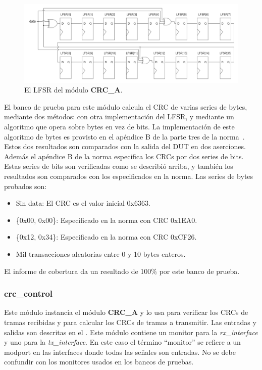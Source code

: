 \documentclass[a4paper, twoside, 11pt]{report}
\begin{document}
\begin{figure}[htb]
  \centering
  \includegraphics[width=1.0\textwidth]{./img/crc_a_lfsr}
  \caption{El LFSR del módulo \textbf{CRC\_A}.}
  \label{fig:crc_lfsr}
\end{figure}

El banco de prueba para este módulo calcula el CRC de varias series de bytes, mediante dos métodos: con otra implementación del LFSR, y mediante un algoritmo que opera sobre bytes en vez de bits. La implementación de este algoritmo de bytes es provisto en el apéndice B de la parte tres de la norma~\cite{iso14443-3}. Estos dos resultados son comparados con la salida del DUT en dos aserciones. Además el apéndice B de la norma especifica los CRCs por dos series de bits. Estas series de bits son verificadas como se describió arriba, y también los resultados son comparados con los especificados en la norma. Las series de bytes probados son:

\begin{itemize}
  \item Sin data: El CRC es el valor inicial 0x6363.
  \item \{0x00, 0x00\}: Especificado en la norma con CRC 0x1EA0.
  \item \{0x12, 0x34\}: Especificado en la norma con CRC 0xCF26.
  \item Mil transacciones aleatorias entre 0 y 10 bytes enteros.
\end{itemize}

El informe de cobertura da un resultado de 100\% por este banco de prueba.

\FloatBarrier
\subsubsection{crc\_control}

Este módulo instancia el módulo \textbf{CRC\_A} y lo usa para verificar los CRCs de tramas recibidas y para calcular los CRCs de tramas a transmitir. Las entradas y salidas son descritas en el . Este módulo contiene un monitor para la \textit{rx\_interface} y uno para la \textit{tx\_interface}. En este caso el término “monitor” se refiere a un modport en las interfaces donde todas las señales son entradas. No se debe confundir con los monitores usados en los bancos de pruebas.
\end{document}
